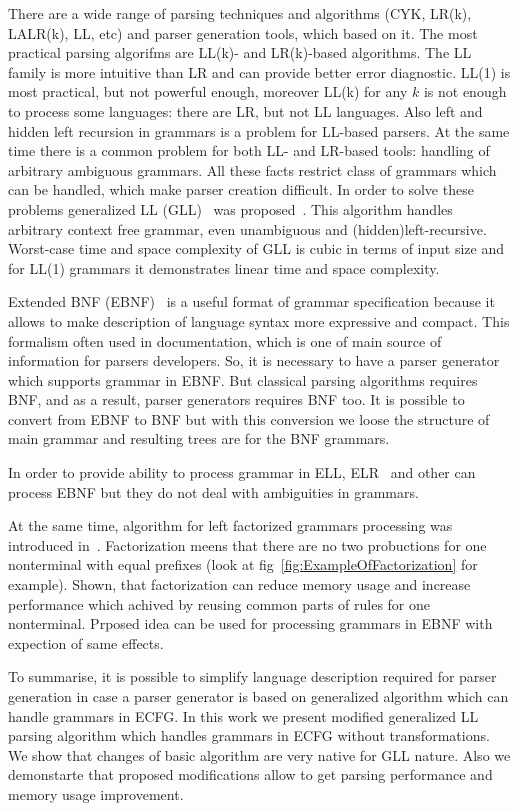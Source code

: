 \documentclass[runningheads,a4paper]{llncs}
\begin{document}
There are a wide range of parsing techniques and algorithms (CYK, LR(k), LALR(k), LL, etc) and parser generation tools, which based on it. 
The most practical parsing algorifms are LL(k)- and LR(k)-based algorithms.
The LL family is more intuitive than LR and can provide better error diagnostic.
LL(1) is most practical, but not powerful enough, moreover LL(k) for any $k$ is not enough to process some languages: there are LR, but not LL languages.
Also left and hidden left recursion in grammars is a problem for LL-based parsers.
At the same time there is a common problem for both LL- and LR-based tools: handling of arbitrary ambiguous grammars.
All these facts restrict class of grammars which can be handled, which make parser creation difficult. 
In order to solve these problems generalized LL (GLL)~\cite{scott2010gll} was proposed~\cite{scott2010gll}. 
This algorithm handles arbitrary context free grammar, even unambiguous and (hidden)left-recursive.
Worst-case time and space complexity of GLL is cubic in terms of input size and for LL(1) grammars it demonstrates linear time and space complexity.

Extended BNF (EBNF)~\cite{EBNFISO} is a useful format of grammar specification because it allows to make description of language syntax more expressive and compact. 
This formalism often used in documentation, which is one of main source of information for parsers developers.
So, it is necessary to have a parser generator which supports grammar in EBNF.
But classical parsing algorithms requires BNF, and as a result, parser generators requires BNF too.
It is possible to convert from EBNF to BNF but with this conversion we loose the structure of main grammar and resulting trees are for the BNF grammars.

In order to provide ability to process grammar in ELL, ELR~\cite{AttributedELL,ELRR,ECFGparsing,ELLParser,ELL,ECFG,ELALR,ELRParsing} and other can process EBNF but they do not deal with ambiguities in grammars.

At the same time, algorithm for left factorized grammars processing was introduced in~\cite{scott2016structuring}.
Factorization meens that there are no two probuctions for one nonterminal with equal prefixes (look at fig~\ref{fig:ExampleOfFactorization} for example).
Shown, that factorization can reduce memory usage and increase performance which achived by reusing common parts of rules for one nonterminal.
Prposed idea can be used for processing grammars in EBNF with expection of same effects.

To summarise, it is possible to simplify language description required for parser generation in case a parser generator is based on generalized algorithm which can handle grammars in ECFG.
In this work we present modified generalized LL parsing algorithm which handles grammars in ECFG without transformations.
We show that changes of basic algorithm are very native for GLL nature. 
Also we demonstarte that proposed modifications allow to get parsing performance and memory usage improvement.
\end{document}
